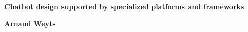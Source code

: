 



\begin{titlepage}
	\begin{center}
		\vspace*{1cm}

		\textbf{\huge Chatbot design supported by specialized platforms and frameworks}

		\vspace{1.5cm}

		\textbf{Arnaud Weyts}

	\end{center}
\end{titlepage}

\afterpage{\blankpage}



\tableofcontents

\printnoidxglossary{}






\listoffigures

\nocite{*}

\printbibliography[title={References},keyword={ref}]

\newpage

\printbibliography[title={Bibliography},keyword={bib}]





